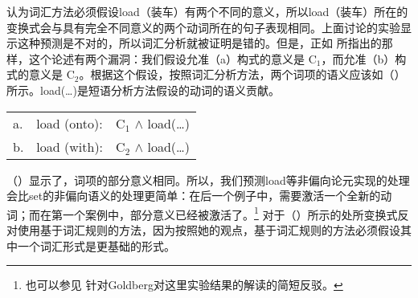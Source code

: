 \begin{exe}
\begin{xlist}[iv.]
\begin{exe}
\begin{xlist}[iv.]
 \citet[]{Goldberg95a}认为词汇方法必须假设load（装车）有两个不同的意义，所以load（装车）所在的变换式会与具有完全不同意义的两个动词所在的句子表现相同。上面讨论的实验显示这种预测是不对的，所以词汇分析就被证明是错的。但是，正如 所指出的那样，这个论述有两个漏洞：我们假设允准（a）构式的意义是 C$_1$，而允准（b）构式的意义是 C$_2$。根据这个假设，按照词汇分析方法，两个词项的语义应该如（）所示。load(\ldots)是短语分析方法假设的动词的语义贡献。
\ea
\begin{tabular}[t]{@{}l@{~}l@{~}l@{}}
a. & load (onto): & C$_1$ $\wedge$ load(\ldots)\\
b. & load (with): & C$_2$ $\wedge$ load(\ldots)\\
\end{tabular}
\z
（）显示了，词项的部分意义相同。所以，我们预测load等非偏向论元实现的处理会比set的非偏向语义的处理更简单：在后一个例子中，需要激活一个全新的动词；而在第一个案例中，部分意义已经被激活了。\footnote{%
   也可以参见 针对Goldberg对这里实验结果的解读的简短反驳。%
}
 \citet[]{Goldberg95a}对于（）所示的处所变换式反对使用基于词汇规则的方法，因为按照她的观点，基于词汇规则的方法必须假设其中一个词汇形式是更基础的形式。

\end{xlist}
\end{exe}
\end{xlist}
\end{exe}
